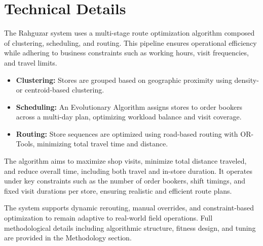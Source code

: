 
\section{Technical Details}

The Rahguzar system uses a multi-stage route optimization algorithm composed of clustering, scheduling, and routing. This pipeline ensures operational efficiency while adhering to business constraints such as working hours, visit frequencies, and travel limits.

\begin{itemize}
    \item \textbf{Clustering:} Stores are grouped based on geographic proximity using density- or centroid-based clustering.
    \item \textbf{Scheduling:} An Evolutionary Algorithm assigns stores to order bookers across a multi-day plan, optimizing workload balance and visit coverage.
    \item \textbf{Routing:} Store sequences are optimized using road-based routing with OR-Tools, minimizing total travel time and distance.
\end{itemize}
The algorithm aims to maximize shop visits, minimize total distance traveled, and reduce overall time, including both travel and in-store duration. It operates under key constraints such as the number of order bookers, shift timings, and fixed visit durations per store, ensuring realistic and efficient route plans.


The system supports dynamic rerouting, manual overrides, and constraint-based optimization to remain adaptive to real-world field operations. Full methodological details including algorithmic structure, fitness design, and tuning are provided in the Methodology section.
